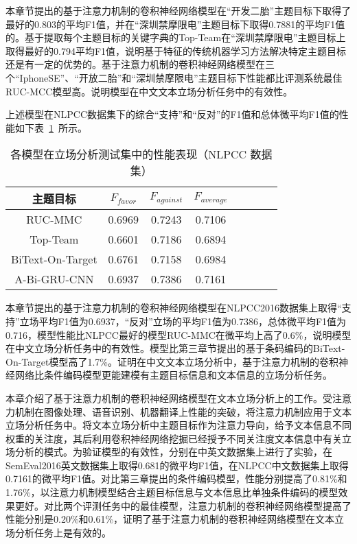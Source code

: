 本章节提出的基于注意力机制的卷积神经网络模型在“开发二胎”主题目标下取得了最好的0.803的平均F1值，并在“深圳禁摩限电”主题目标下取得0.7881的平均F1值的。基于提取每个主题目标的关键字典的Top-Team在“深圳禁摩限电”主题目标上取得最好的0.794平均F1值，说明基于特征的传统机器学习方法解决特定主题目标还是有一定的优势的。基于注意力机制的卷积神经网络模型在三个“IphoneSE”、“开放二胎”和“深圳禁摩限电”主题目标下性能都比评测系统最佳RUC-MCC模型高。说明模型在中文文本立场分析任务中的有效性。

上述模型在NLPCC数据集下的综合“支持”和“反对”的F1值和总体微平均F1值的性能如下表~\ref{nlpcc_res_attention}~所示。
\begin{table}[htbp]
	\caption[table123]{各模型在立场分析测试集中的性能表现（NLPCC 数据集）}
	\label{nlpcc_res_attention}
	\vspace{0.5em}\centering\wuhao
	\begin{tabular}{cccccccc}
		\toprule[1.5pt]
		主题目标& $F_{favor}$&$F_{against}$&$F_{average}$ \\
		\midrule[1pt]
		RUC-MMC&0.6969&0.7243&0.7106\\
		Top-Team&0.6601&0.7186&0.6894\\
		BiText-On-Target&0.6761&0.7158&0.6984\\
		A-Bi-GRU-CNN&0.6937&0.7386&0.7161\\
		\bottomrule[1.5pt]
	\end{tabular}
\end{table}

本章节提出的基于注意力机制的卷积神经网络模型在NLPCC2016数据集上取得“支持”立场平均F1值为0.6937，“反对”立场的平均F1值为0.7386，总体微平均F1值为0.716，模型性能比NLPCC最好的模型RUC-MMC在微平均上高了0.6\%，说明模型在中文立场分析任务中的有效性。模型比第三章节提出的基于条码编码的BiText-On-Target模型高了1.7\%。证明在中文文本立场分析中，基于注意力机制的卷积神经网络比条件编码模型更能建模有主题目标信息和文本信息的立场分析任务。



本章介绍了基于注意力机制的卷积神经网络模型在文本立场分析上的工作。受注意力机制在图像处理、语音识别、机器翻译上性能的突破，将注意力机制应用于文本立场分析任务中。将文本立场分析中主题目标作为注意力导向，给予文本信息不同权重的关注度，其后利用卷积神经网络挖掘已经授予不同关注度文本信息中有关立场分析的模式。为验证模型的有效性，分别在中英文数据集上进行了实验，在SemEval2016英文数据集上取得0.681的微平均F1值，在NLPCC中文数据集上取得0.7161的微平均F1值。对比第三章提出的条件编码模型，性能分别提高了0.81\%和1.76\%，以注意力机制模型结合主题目标信息与文本信息比单独条件编码的模型效果更好。对比两个评测任务中的最佳模型，注意力机制的卷积神经网络模型提高了性能分别是0.20\%和0.61\%，证明了基于注意力机制的卷积神经网络模型在文本立场分析任务上是有效的。



